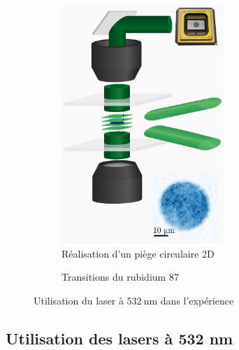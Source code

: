 \documentclass[11pt,a4paper] { article}
\newcommand{\lmbd}[1]{$\SI{#1}{\nano\metre}$}
\begin{document}
\begin{figure}[htbp]
	\centering
	\begin{subfigure}[b]{0.48\textwidth}
    	\centering
    	\small
	\includegraphics[height=9cm]{img/accordeon-dmd.pdf}
	\caption{\small Réalisation d'un piège circulaire 2D \footnotemark}
		\label{fig:accordeon}
	\end{subfigure}	
	\begin{subfigure}[b]{0.48\textwidth}
		\centering
		\small
		\resizebox{!}{9cm}{
   			
		}
		\caption{\small Transitions du rubidium 87}
		\label{fig:transitions}
	\end{subfigure}

	\caption{\small Utilisation du laser à \lmbd{532} dans l'expérience}
\end{figure}



\subsection{Utilisation des lasers à 532 nm}
\end{document}
